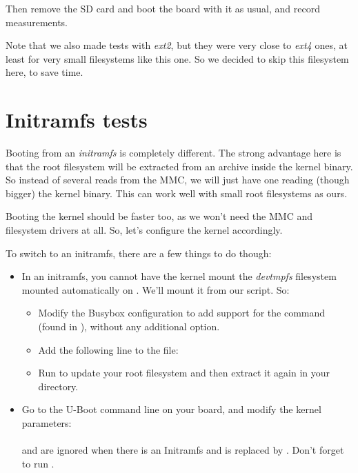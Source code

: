 Then remove the SD card and boot the board with it as usual, and record
measurements.

Note that we also made tests with {\em ext2}, but they were very close
to {\em ext4} ones, at least for very small filesystems like this one.
So we decided to skip this filesystem here, to save time.

\section{Initramfs tests}

Booting from an {\em initramfs} is completely different. The strong
advantage here is that the root filesystem will be extracted from an
archive inside the kernel binary. So instead of several reads from the
MMC, we will just have one reading (though bigger) the kernel binary.
This can work well with small root filesystems as ours.

Booting the kernel should be faster too, as we won't need the MMC and
filesystem drivers at all. So, let's configure the kernel accordingly.

To switch to an initramfs, there are a few things to do though:
\begin{itemize}
\item In an initramfs, you cannot have the kernel mount the {\em
devtmpfs} filesystem mounted automatically on . We'll mount
it from our  script.
So:
   \begin{itemize}
   \item Modify the Busybox configuration to add support for the
    command (found in ), without
    any additional option.
   \item Add the following line to the  file:\\
   \item Run  to update your root filesystem and then
   extract it again in your  directory.
   \end{itemize}
\item Go to the U-Boot command line on your board, and modify the
kernel parameters:\\
   \\
    and  are ignored when there is an
   Initramfs and  is replaced by .
   Don't forget to run .
\end{itemize}

